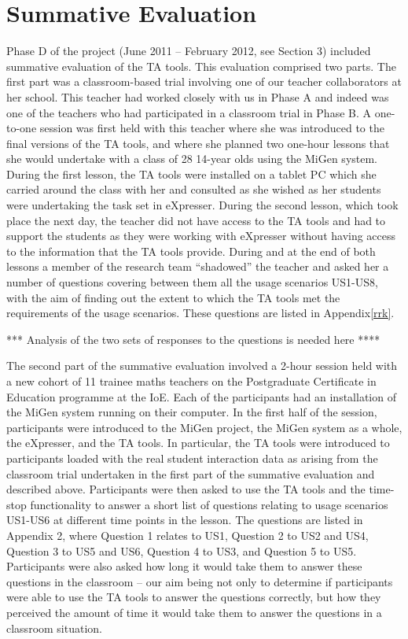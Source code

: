 
\section{Summative Evaluation}
\label{sec:summative-evaluation}

Phase D of the project (June 2011 – February 2012, see Section 3)
included summative evaluation of the TA tools. This evaluation
comprised two parts. The first part was a classroom-based trial
involving one of our teacher collaborators at her school.  This
teacher had worked closely with us in Phase A and indeed was one of
the teachers who had participated in a classroom trial in Phase B. A
one-to-one session was first held with this teacher where she was
introduced to the final versions of the TA tools, and where she
planned two one-hour lessons that she would undertake with a class of
28 14-year olds using the MiGen system. During the first lesson, the
TA tools were installed on a tablet PC which she carried around the
class with her and consulted as she wished as her students were
undertaking the task set in eXpresser. During the second lesson, which
took place the next day, the teacher did not have access to the TA
tools and had to support the students as they were working with
eXpresser without having access to the information that the TA tools
provide.  During and at the end of both lessons a member of the
research team “shadowed” the teacher and asked her a number of
questions covering between them all the usage scenarios US1-US8, with
the aim of finding out the extent to which the TA tools met the
requirements of the usage scenarios. These questions are listed in
Appendix\ref{rrk}. 
 
*** Analysis of the two sets of responses to the questions is needed
here ****


The second part of the summative evaluation involved a 2-hour session
held with a new cohort of 11 trainee maths teachers on the
Postgraduate Certificate in Education programme at the IoE. Each of
the participants had an installation of the MiGen system running on
their computer. In the first half of the session, participants were
introduced to the MiGen project, the MiGen system as a whole, the
eXpresser, and the TA tools. In particular, the TA tools were
introduced to participants loaded with the real student interaction
data as arising from the classroom trial undertaken in the first part
of the summative evaluation and described above. Participants were
then asked to use the TA tools and the time-stop functionality to
answer a short list of questions relating to usage scenarios US1-US6
at different time points in the lesson. The questions are listed in
Appendix 2, where Question 1 relates to US1, Question 2 to US2 and
US4, Question 3 to US5 and US6, Question 4 to US3, and Question 5 to
US5. Participants were also asked how long it would take them to
answer these questions in the classroom – our aim being not only to
determine if participants were able to use the TA tools to answer the
questions correctly, but how they perceived the amount of time it
would take them to answer the questions in a classroom situation. 

